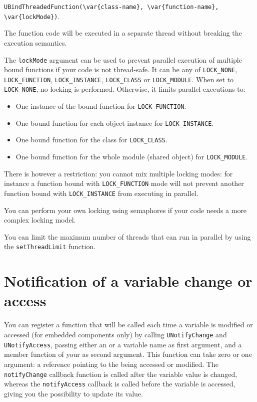 \lstinline|UBindThreadedFunction(\var{class-name}, \var{function-name}, \var{lockMode})|.

The function code will be executed in a separate thread without breaking the
\us execution semantics.

The \lstinline{lockMode} argument can be used to prevent parallel execution
of multiple bound functions if your code is not thread-safe. It can be any of
\lstinline{LOCK_NONE}, \lstinline{LOCK_FUNCTION}, \lstinline{LOCK_INSTANCE},
\lstinline{LOCK_CLASS} or \lstinline{LOCK_MODULE}.
When set to \lstinline{LOCK_NONE}, no locking is performed. Otherwise, it
limits parallel executions to:

\begin{itemize}
\item One instance of the bound function for \lstinline{LOCK_FUNCTION}.
\item One bound function for each object instance for
\lstinline{LOCK_INSTANCE}.
\item One bound function for the class for \lstinline{LOCK_CLASS}.
\item One bound function for the whole module (shared object) for
\lstinline{LOCK_MODULE}.
\end{itemize}

There is however a restriction: you cannot mix multiple locking modes: for
instance a function bound with \lstinline{LOCK_FUNCTION} mode will not prevent
another function bound with \lstinline{LOCK_INSTANCE} from executing in
parallel.

You can perform your own locking using semaphores if your code needs a more
complex locking model.

You can limit the maximum number of threads that can run in parallel by using
the \lstinline{setThreadLimit} function.

\section{Notification of a variable change or access}
\label{sec:uobject:uvar-notify}
You can register a function that will be called each time a variable
is modified or accessed (for embedded components only) by calling
\lstinline{UNotifyChange} and \lstinline{UNotifyAccess}, passing
either an \UVar or a variable name as first argument, and a member
function of your \UObject as second argument. This function can take
zero or one argument: a \UVar reference pointing to the \UVar being
accessed or modified. The \lstinline{notifyChange} callback function
is called after the variable value is changed, whereas the
\lstinline{notifyAccess} callback is called before the variable is
accessed, giving you the possibility to update its value.

